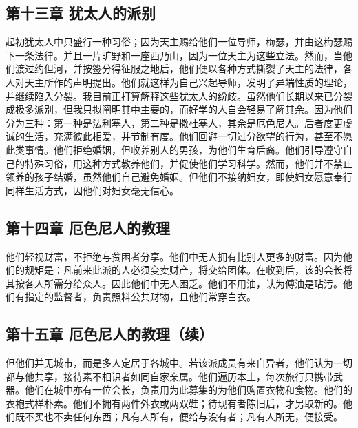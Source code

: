 
\subsection{第十三章 犹太人的派别}

起初犹太人中只盛行一种习俗；因为天主赐给他们一位导师，梅瑟，并由这梅瑟赐下一条法律。并且一片旷野和一座西乃山，因为一位天主为这些立法。然而，当他们渡过约但河，并按签分得征服之地后，他们便以各种方式撕裂了天主的法律，各人对天主所作的声明提出。他们就这样为自己兴起导师，发明了异端性质的理论，并继续陷入分裂。我目前正打算解释这些犹太人的纷歧。虽然他们长期以来已分裂成极多派别，但我只拟阐明其中主要的，而好学的人自会轻易了解其余。因为他们分为三种：第一种是法利塞人，第二种是撒杜塞人，其余是厄色尼人。后者度更虔诚的生活，充满彼此相爱，并节制有度。他们回避一切过分欲望的行为，甚至不愿此类事情。他们拒绝婚姻，但收养别人的男孩，为他们生育后裔。他们引导遵守自己的特殊习俗，用这种方式教养他们，并促使他们学习科学。然而，他们并不禁止领养的孩子结婚，虽然他们自己避免婚姻。但他们不接纳妇女，即使妇女愿意奉行同样生活方式，因他们对妇女毫无信心。\par


\subsection{第十四章 厄色尼人的教理}

他们轻视财富，不拒绝与贫困者分享。他们中无人拥有比别人更多的财富。因为他们的规矩是：凡前来此派的人必须变卖财产，将交给团体。在收到后，该的会长将其按各人所需分给众人。因此他们中无人困乏。他们不用油，认为傅油是玷污。他们有指定的监督者，负责照料公共财物，且他们常穿白衣。\par


\subsection{第十五章 厄色尼人的教理（续）}

但他们并无城市，而是多人定居于各城中。若该派成员有来自异者，他们认为一切都与他共享，接待素不相识者如同自家亲属。他们遍历本土，每次旅行只携带武器。他们在城中亦有一位会长，负责用为此募集的为他们购置衣物和食物。他们的衣袍式样朴素。他们不拥有两件外衣或两双鞋；待现有者陈旧后，才另取新的。他们既不买也不卖任何东西；凡有人所有，便给与没有者；凡有人所无，便接受。\par

